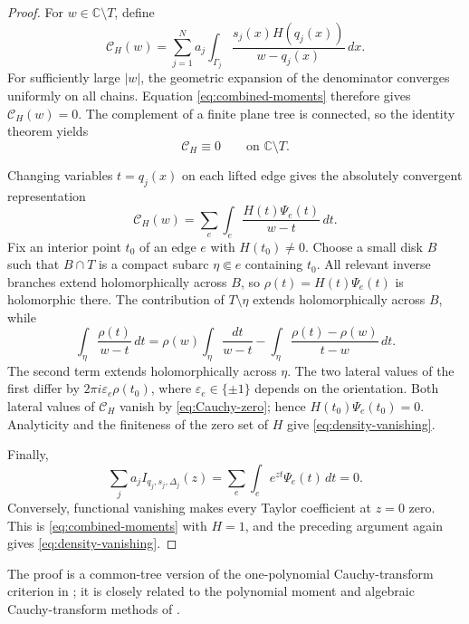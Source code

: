 \documentclass[11pt]{article}
\numberwithin{equation}{section}
\theoremstyle{definition}
\theoremstyle{remark}
\newcommand{\C}{\mathbb C}
\begin{document}
\begin{proof}
For $w\in\C\setminus T$, define
\begin{equation}\label{eq:combined-Cauchy-transform}
  \mathcal C_H(w)
  =\sum_{j=1}^{N}a_j
    \int_{\Gamma_j}
      \frac{s_j(x)H(q_j(x))}{w-q_j(x)}\,dx.
\end{equation}
For sufficiently large $|w|$, the geometric expansion of the denominator
converges uniformly on all chains.  Equation \eqref{eq:combined-moments}
therefore gives $\mathcal C_H(w)=0$.  The complement of a finite plane tree
is connected, so the identity theorem yields
\begin{equation}\label{eq:Cauchy-zero}
  \mathcal C_H\equiv0
  \qquad\text{on }\C\setminus T.
\end{equation}

Changing variables $t=q_j(x)$ on each lifted edge gives the absolutely
convergent representation
\begin{equation}\label{eq:Cauchy-edge-representation}
  \mathcal C_H(w)
  =\sum_e\int_e\frac{H(t)\Psi_e(t)}{w-t}\,dt.
\end{equation}
Fix an interior point $t_0$ of an edge $e$ with $H(t_0)\ne0$.  Choose a
small disk $B$ such that $B\cap T$ is a compact subarc
$\eta\Subset e$ containing $t_0$.  All relevant inverse branches extend
holomorphically across $B$, so
$\rho(t)=H(t)\Psi_e(t)$ is holomorphic there.  The contribution of
$T\setminus\eta$ extends holomorphically across $B$, while
\begin{equation}\label{eq:local-Cauchy-splitting}
  \int_\eta\frac{\rho(t)}{w-t}\,dt
  =\rho(w)\int_\eta\frac{dt}{w-t}
   -\int_\eta\frac{\rho(t)-\rho(w)}{t-w}\,dt.
\end{equation}
The second term extends holomorphically across $\eta$.  The two lateral
values of the first differ by
$2\pi i\varepsilon_e\rho(t_0)$, where
$\varepsilon_e\in\{\pm1\}$ depends on the orientation.  Both lateral
values of $\mathcal C_H$ vanish by \eqref{eq:Cauchy-zero}; hence
$H(t_0)\Psi_e(t_0)=0$.  Analyticity and the finiteness of the zero set of
$H$ give \eqref{eq:density-vanishing}.

Finally,
\[
  \sum_j a_jI_{q_j,s_j,\Delta_j}(z)
  =\sum_e\int_e e^{zt}\Psi_e(t)\,dt=0.
\]
Conversely, functional vanishing makes every Taylor coefficient at $z=0$
zero.  This is \eqref{eq:combined-moments} with $H=1$, and the preceding
argument again gives \eqref{eq:density-vanishing}.
\end{proof}

The proof is a common-tree version of the one-polynomial Cauchy-transform
criterion in \cite{LongEIT}; it is closely related to the polynomial moment
and algebraic Cauchy-transform methods of
\cite{PakovichMuzychuk,PakovichRoytvarfYomdin,GavrilovPakovich}.
\end{document}
